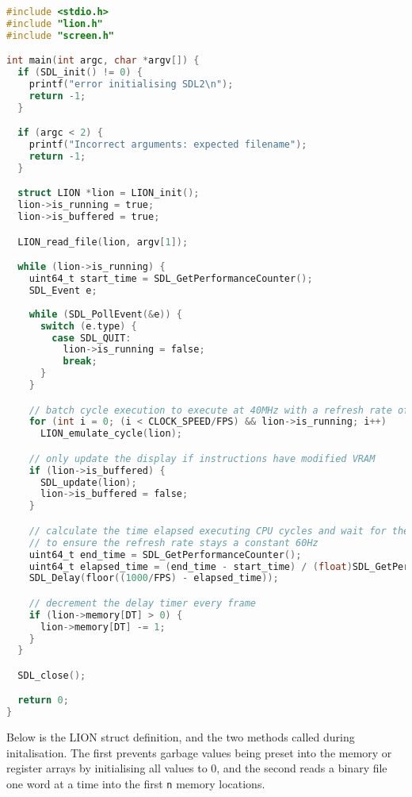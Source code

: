\begin{lstlisting}[language=C]
#include <stdio.h>
#include "lion.h"
#include "screen.h"

int main(int argc, char *argv[]) {
  if (SDL_init() != 0) {
    printf("error initialising SDL2\n");
    return -1;
  }

  if (argc < 2) {
    printf("Incorrect arguments: expected filename");
    return -1;
  }

  struct LION *lion = LION_init();
  lion->is_running = true;
  lion->is_buffered = true; 

  LION_read_file(lion, argv[1]);

  while (lion->is_running) {
    uint64_t start_time = SDL_GetPerformanceCounter();
    SDL_Event e;
    
    while (SDL_PollEvent(&e)) {
      switch (e.type) {
        case SDL_QUIT:
          lion->is_running = false;
          break;
      }
    }

    // batch cycle execution to execute at 40MHz with a refresh rate of 60Hz
    for (int i = 0; (i < CLOCK_SPEED/FPS) && lion->is_running; i++)
      LION_emulate_cycle(lion);

    // only update the display if instructions have modified VRAM 
    if (lion->is_buffered) {
      SDL_update(lion);
      lion->is_buffered = false;
    }

    // calculate the time elapsed executing CPU cycles and wait for the remaining time 
    // to ensure the refresh rate stays a constant 60Hz
    uint64_t end_time = SDL_GetPerformanceCounter();
    uint64_t elapsed_time = (end_time - start_time) / (float)SDL_GetPerformanceFrequency() * 1000.0f;
    SDL_Delay(floor((1000/FPS) - elapsed_time));

    // decrement the delay timer every frame
    if (lion->memory[DT] > 0) {
      lion->memory[DT] -= 1;
    }
  }

  SDL_close();

  return 0;
}
\end{lstlisting}

Below is the LION struct definition, and the two methods called during initalisation. The first prevents garbage values being preset into the memory or register arrays by initialising all values to 0, and the second reads a binary file one word at a time into the first \texttt{n} memory locations.

